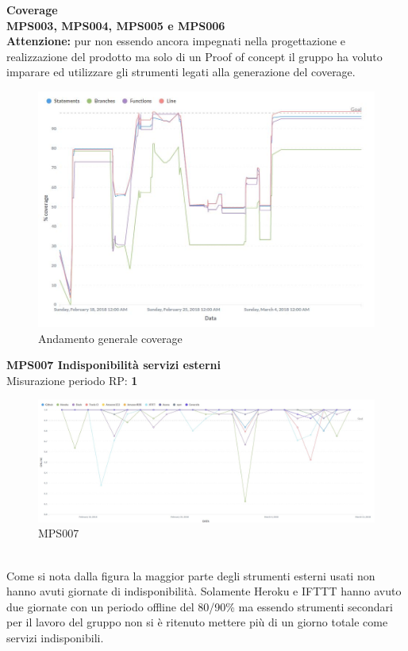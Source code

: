 \documentclass[PianoDiQualifica.tex]{subfiles}
\begin{document}
\newpage
\textbf{Coverage}
\\
	\textbf{MPS003, MPS004, MPS005 e MPS006}
\\
\textbf{Attenzione:} pur non essendo ancora impegnati nella progettazione e realizzazione del prodotto ma solo di un Proof of concept il gruppo ha voluto imparare ed utilizzare gli strumenti legati alla generazione del coverage.
\begin{figure}[htb]
	\centering
	\includegraphics[width=1\linewidth]{RP/coverage}
	\caption{Andamento generale coverage}
	\label{fig:processi}
\end{figure}
\newpage


\textbf{MPS007 Indisponibilità servizi esterni}\\
Misurazione periodo RP: \textbf{1}
\begin{figure}[htb]
	\centering
	\includegraphics[width=1\linewidth]{RP/MPS007}
	\caption{MPS007}
	\label{fig:processi}
\end{figure}
\\Come si nota dalla figura la maggior parte degli strumenti esterni usati non hanno avuti giornate di indisponibilità.
Solamente Heroku e IFTTT hanno avuto due giornate con un periodo offline del 80/90\% ma essendo strumenti secondari per il lavoro del gruppo non si è ritenuto mettere più di un giorno totale come servizi indisponibili.\\
\end{document}
